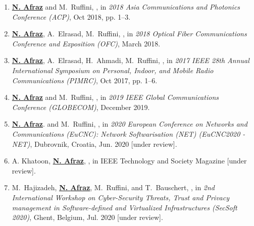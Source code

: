 \begin{enumerate}
    \item \textbf{\underline{N. {Afraz}}} and M.~{Ruffini}, , in \emph{2018 Asia Communications and Photonics Conference (ACP)}, Oct 2018, pp. 1--3.

    \item \textbf{\underline{N. {Afraz}}}, A.~{Elrasad}, M.~{Ruffini}, , in \emph{2018 Optical Fiber Communications Conference and Exposition (OFC)}, March 2018.
   
    \item \textbf{\underline{N. {Afraz}}}, A.~{Elrasad}, H.~Ahmadi,  M.~{Ruffini}, , in \emph{2017 IEEE 28th Annual International Symposium on Personal, Indoor, and Mobile Radio Communications (PIMRC)}, Oct 2017, pp. 1--6.

    
    \item  \textbf{\underline{N. {Afraz}}} and M.~{Ruffini}, , in \emph{2019 IEEE Global Communications Conference (GLOBECOM)}, December 2019.
    
    \item \textbf{\underline{N. {Afraz}}}. and M.~Ruffini, , in \emph{2020 European Conference on Networks and Communications (EuCNC): Network Softwarisation (NET) (EuCNC2020 - NET)}, Dubrovnik, Croatia, Jun. 2020 [under review].
    
    \item {A. {Khatoon}}, \textbf{\underline{N. {Afraz}}}, , in IEEE Technology and Society Magazine [under review].
    
    \item {M.~Hajizadeh}, \textbf{\underline{N. {Afraz}}}, M.~Ruffini, and T.~Bauschert, , in \emph{2nd International Workshop on Cyber-Security Threats, Trust and Privacy management in Software-defined and Virtualized Infrastructures (SecSoft 2020)}, Ghent, Belgium, Jul. 2020 [under review].

    
 \end{enumerate}
